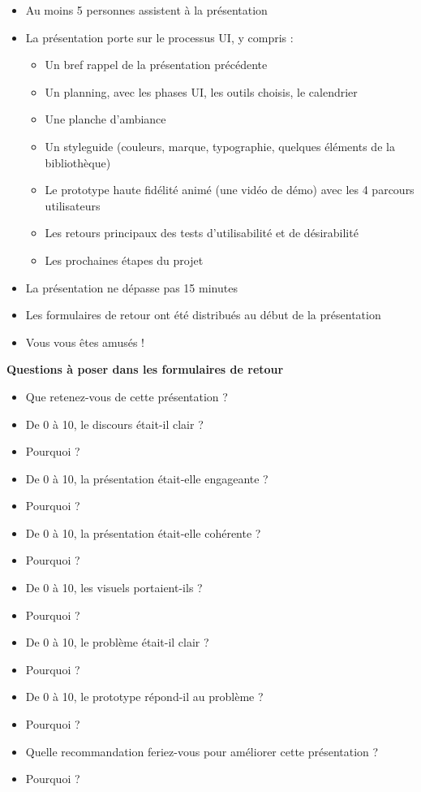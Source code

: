 \begin{itemize}
\item Au moins 5 personnes assistent à la présentation
\item La présentation porte sur le processus UI, y compris :
\begin{itemize}
\item Un bref rappel de la présentation précédente
\item Un planning, avec les phases UI, les outils choisis, le calendrier
\item Une planche d'ambiance
\item Un styleguide (couleurs, marque, typographie, quelques éléments de la bibliothèque)
\item Le prototype haute fidélité animé (une vidéo de démo) avec les 4 parcours utilisateurs
\item Les retours principaux des tests d'utilisabilité et de désirabilité
\item Les prochaines étapes du projet
\end{itemize}
\item La présentation ne dépasse pas 15 minutes
\item Les formulaires de retour ont été distribués au début de la présentation
\item Vous vous êtes amusés !
\end{itemize}

\textbf{Questions à poser dans les formulaires de retour}

\begin{itemize}
\item Que retenez-vous de cette présentation ?
\item De 0 à 10, le discours était-il clair ?
\item Pourquoi ?
\item De 0 à 10, la présentation était-elle engageante ?
\item Pourquoi ?
\item De 0 à 10, la présentation était-elle cohérente ?
\item Pourquoi ?
\item De 0 à 10, les visuels portaient-ils ?
\item Pourquoi ?
\item De 0 à 10, le problème était-il clair ?
\item Pourquoi ?
\item De 0 à 10, le prototype répond-il au problème ?
\item Pourquoi ?
\item Quelle recommandation feriez-vous pour améliorer cette présentation ?
\item Pourquoi ?
\end{itemize}

